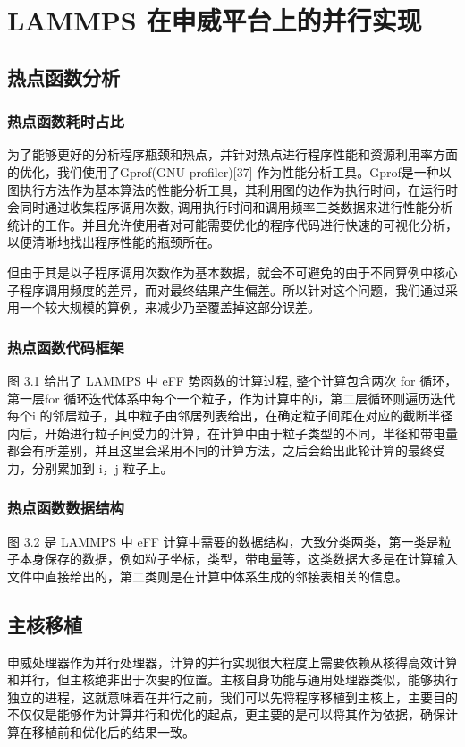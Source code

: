 
\chapter{LAMMPS 在申威平台上的并行实现}

\section{热点函数分析}
\subsection{热点函数耗时占比}
为了能够更好的分析程序瓶颈和热点，并针对热点进行程序性能和资源利用率方面的优化，我们使用了Gprof(GNU profiler)[37] 作为性能分析工具。Gprof是一种以图执行方法作为基本算法的性能分析工具，其利用图的边作为执行时间，在运行时会同时通过收集程序调用次数, 调用执行时间和调用频率三类数据来进行性能分析统计的工作。并且允许使用者对可能需要优化的程序代码进行快速的可视化分析，以便清晰地找出程序性能的瓶颈所在。

但由于其是以子程序调用次数作为基本数据，就会不可避免的由于不同算例中核心子程序调用频度的差异，而对最终结果产生偏差。所以针对这个问题，我们通过采用一个较大规模的算例，来减少乃至覆盖掉这部分误差。

\subsection{热点函数代码框架}
图 3.1 给出了 LAMMPS 中 eFF 势函数的计算过程, 整个计算包含两次 for 循环，第一层for 循环迭代体系中每个一个粒子，作为计算中的i，第二层循环则遍历迭代每个i 的邻居粒子，其中粒子由邻居列表给出，在确定粒子间距在对应的截断半径内后，开始进行粒子间受力的计算，在计算中由于粒子类型的不同，半径和带电量都会有所差别，并且这里会采用不同的计算方法，之后会给出此轮计算的最终受力，分别累加到 i，j 粒子上。

\subsection{热点函数数据结构}
图 3.2 是 LAMMPS 中 eFF 计算中需要的数据结构，大致分类两类，第一类是粒子本身保存的数据，例如粒子坐标，类型，带电量等，这类数据大多是在计算输入文件中直接给出的，第二类则是在计算中体系生成的邻接表相关的信息。

\section{主核移植}
申威处理器作为并行处理器，计算的并行实现很大程度上需要依赖从核得高效计算和并行，但主核绝非出于次要的位置。主核自身功能与通用处理器类似，能够执行独立的进程，这就意味着在并行之前，我们可以先将程序移植到主核上，主要目的不仅仅是能够作为计算并行和优化的起点，更主要的是可以将其作为依据，确保计算在移植前和优化后的结果一致。

